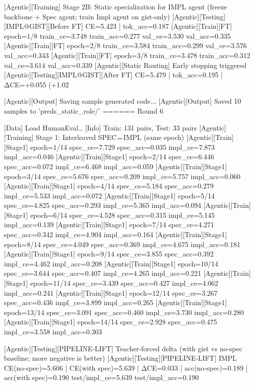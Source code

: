 [Agentic][Training] Stage 2B: Static specialization for IMPL agent (freeze backbone + Spec agent; train Impl agent on gist-only)
[Agentic][Testing][IMPL@GIST][Before FT] CE=5.423 | tok_acc=0.187
[Agentic][Train][FT] epoch=1/8 train_ce=3.748 train_acc=0.277 val_ce=3.530 val_acc=0.335
[Agentic][Train][FT] epoch=2/8 train_ce=3.584 train_acc=0.299 val_ce=3.576 val_acc=0.343
[Agentic][Train][FT] epoch=3/8 train_ce=3.478 train_acc=0.312 val_ce=3.614 val_acc=0.339
[Agentic][Static Routing] Early stopping triggered
[Agentic][Testing][IMPL@GIST][After FT] CE=5.479 | tok_acc=0.195 | ΔCE=+0.055 (+1.02%

[Agentic][Output] Saving sample generated code...
[Agentic][Output] Saved 10 samples to 'preds_static_role/'
======
Round 6

[Data] Load HumanEval…
[Info] Train: 131 pairs, Test: 33 pairs
[Agentic][Training] Stage 1: Interleaved SPEC↔IMPL (same epoch)
[Agentic][Train][Stage1] epoch=1/14 spec_ce=7.729 spec_acc=0.035 impl_ce=7.873 impl_acc=0.046
[Agentic][Train][Stage1] epoch=2/14 spec_ce=6.446 spec_acc=0.072 impl_ce=6.468 impl_acc=0.059
[Agentic][Train][Stage1] epoch=3/14 spec_ce=5.676 spec_acc=0.209 impl_ce=5.757 impl_acc=0.060
[Agentic][Train][Stage1] epoch=4/14 spec_ce=5.184 spec_acc=0.279 impl_ce=5.533 impl_acc=0.072
[Agentic][Train][Stage1] epoch=5/14 spec_ce=4.825 spec_acc=0.293 impl_ce=5.365 impl_acc=0.094
[Agentic][Train][Stage1] epoch=6/14 spec_ce=4.528 spec_acc=0.315 impl_ce=5.145 impl_acc=0.139
[Agentic][Train][Stage1] epoch=7/14 spec_ce=4.271 spec_acc=0.342 impl_ce=4.904 impl_acc=0.164
[Agentic][Train][Stage1] epoch=8/14 spec_ce=4.049 spec_acc=0.369 impl_ce=4.675 impl_acc=0.181
[Agentic][Train][Stage1] epoch=9/14 spec_ce=3.855 spec_acc=0.392 impl_ce=4.462 impl_acc=0.208
[Agentic][Train][Stage1] epoch=10/14 spec_ce=3.644 spec_acc=0.407 impl_ce=4.265 impl_acc=0.221
[Agentic][Train][Stage1] epoch=11/14 spec_ce=3.439 spec_acc=0.427 impl_ce=4.062 impl_acc=0.241
[Agentic][Train][Stage1] epoch=12/14 spec_ce=3.267 spec_acc=0.436 impl_ce=3.899 impl_acc=0.265
[Agentic][Train][Stage1] epoch=13/14 spec_ce=3.091 spec_acc=0.460 impl_ce=3.730 impl_acc=0.280
[Agentic][Train][Stage1] epoch=14/14 spec_ce=2.928 spec_acc=0.475 impl_ce=3.558 impl_acc=0.303

[Agentic][Testing][PIPELINE-LIFT] Teacher-forced delta (with gist vs no-spec baseline; more negative is better)
[Agentic][Testing][PIPELINE-LIFT] IMPL CE(no-spec)=5.606 | CE(with spec)=5.639 | ΔCE=0.033 | acc(no-spec)=0.189 | acc(with spec)=0.190
test/impl_ce=5.639 test/impl_acc=0.190

